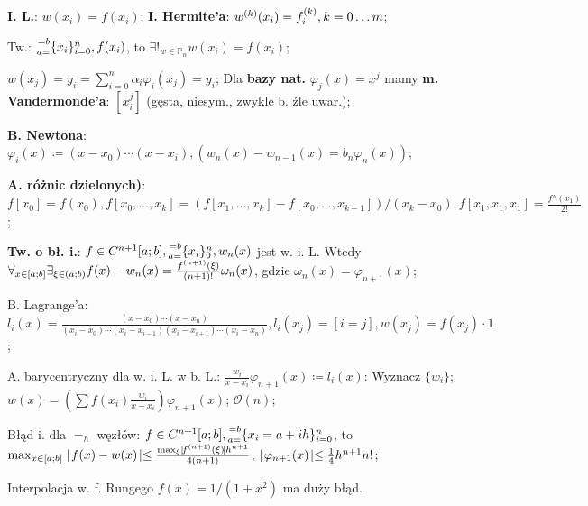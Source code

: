 
\entry
\textbf{I. L.}:
$w(x_i) = f(x_i)$;
\entry
\textbf{I. Hermite'a}:
$w^{(k)}(x_i) = f^{(k)}_i, k = 0 \ldots m$;

\entry
Tw.:
$\ipoints[i=0][n][a=][=b]{x_i}, f(x_i)$,
to
$\exists!_{w \in \mathbb{P}_n} w(x_i)=f(x_i)$;

\entry
$w(x_j) = y_i = \sum_{i=0}^n\alpha_i\varphi_i(x_j) = y_i$;
\entry
Dla \textbf{bazy nat.}
$\varphi_j(x)=x^j$
mamy \textbf{m. Vandermonde'a}:
$[x^j_i]$
(gęsta, niesym., zwykle b. źle uwar.);

\entry
\textbf{B. Newtona}:
$\varphi_i(x) \coloneqq (x-x_0)\cdots(x-x_i),
(w_n(x)-w_{n-1}(x) = b_n\varphi_n(x))$;

\entry
\textbf{A. różnic dzielonych)}:
$
f[x_0] = f(x_0),
f[x_0,\ldots,x_k] = (f[x_1,\ldots,x_k] - f[x_0,\ldots,x_{k-1}])/(x_k - x_0),
f[x_1, x_1, x_1] = \frac{f''(x_1)}{2!}
$;


\textbf{Tw. o bł. i.}:
$f\in C^{n+1}[a;b], \ipoints[0][n][a=][=b]{x_i}, w_n(x)$ jest w. i. L.
Wtedy
$\forall_{x \in [a;b]} \exists_{\xi \in (a;b)} f(x) - w_n(x) = \frac{f^{(n+1)}(\xi)}{(n+1)!}\omega_n(x)$,
gdzie $\omega_n(x)=\varphi_{n+1}(x)$;


\entry
B. Lagrange'a:
$
l_i(x) = \frac{(x-x_0)\cdots(x-x_n)}{(x_i - x_0)\cdots(x_i - x_{i-1})(x_i - x_{i+1}) \cdots (x_i - x_n)},
l_i(x_j) = [i=j],
w(x_j)=f(x_j)\cdot 1
$;

\entry
A. barycentryczny dla w. i. L. w b. L.:
$\frac{w_i}{x - x_i}\varphi_{n+1}(x) \coloneqq l_i(x)$:
Wyznacz
$\{w_i\}$;
$w(x) = (\sum f(x_i)\frac{w_i}{x - x_i})\varphi_{n+1}(x)$;
$\mathcal{O}(n)$;

\entry
Błąd i. dla $=_h$ węzłów:
$f \in C^{n+1}[a;b], \ipoints[i=0][n][a=][=b]{x_i=a+ih}$, to
$\max_{x \in [a;b]}\mid\! f(x)-w(x)\! \mid \leq \frac{\max_\xi\mid\! f^{(n+1)}(\xi)\! \mid h^{n+1}}{4(n+1)}$,
$\mid\! \varphi_{n+1}(x)\! \mid \leq \frac{1}{4} h^{n+1} n!$;

\entry
Interpolacja w. f. Rungego
$f(x)=1/(1+x^2)$
ma duży błąd.
